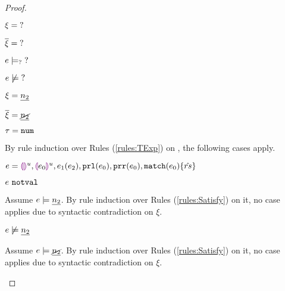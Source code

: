 \begin{proof}
\begin{byCases}
\item[\text{(\ref{rule:CTUnknown})}]
    \begin{pfsteps*}
    \item $\xi=\mathtt{?}$ 
    \item $\overline{\xi}=\mathtt{?}$ 
    \item $e \models_{?} \mathtt{?}$ 
    \item $e \not\models \mathtt{?}$ 
    \end{pfsteps*}
    
\item[\text{(\ref{rule:CTNum})}]
    \begin{pfsteps*}
    \item $\xi=\underline{n_2}$ 
    \item $\overline{\xi}=\underline{\cancel{n_2}}$ 
    \item $\tau=\mathtt{num}$ 
    \end{pfsteps*}
    By rule induction over Rules (\ref{rules:TExp}) on , the following cases apply.
    \begin{byCases}
    \item[\text{(\ref{rule:TEHole}),(\ref{rule:THole}),(\ref{rule:TAp}),(\ref{rule:TPrl}),(\ref{rule:TPrr}),(\ref{rule:TMatchZPre}),(\ref{rule:TMatchNZPre})}]
        \begin{pfsteps*}
        \item $e=\textcolor{violet}{\llparenthesis}\textcolor{violet}{\rrparenthesis}^{u},\textcolor{violet}{\llparenthesis} e_0\textcolor{violet}{\rrparenthesis}^{u},e_1(e_2),\mathtt{prl}(e_0),\mathtt{prr}(e_0),\mathtt{match}(e_0) \{\hat{rs}\}$ 
        \item $e ~\mathtt{notval}$  
        \end{pfsteps*}
        Assume $e \models \underline{n_2}$. By rule induction over Rules (\ref{rules:Satisfy}) on it, no case applies due to syntactic contradiction on $\xi$.
        \begin{pfsteps*}
        \item $e \not\models \underline{n_2}$  
        \end{pfsteps*}
        Assume $e \models \underline{\cancel{n_2}}$. By rule induction over Rules (\ref{rules:Satisfy}) on it, no case applies due to syntactic contradiction on $\xi$.

\end{byCases}
\end{byCases}
\end{proof}
